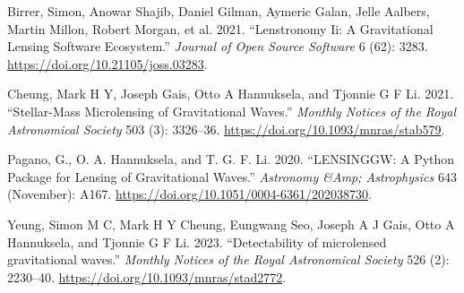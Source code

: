 \documentclass[10pt,a4paper,onecolumn]{article}
\begin{document}
\hypertarget{refs}{}
\begin{cslreferences}
\leavevmode\hypertarget{ref-Birrer_2021}{}%
Birrer, Simon, Anowar Shajib, Daniel Gilman, Aymeric Galan, Jelle
Aalbers, Martin Millon, Robert Morgan, et al. 2021. ``Lenstronomy Ii: A
Gravitational Lensing Software Ecosystem.'' \emph{Journal of Open Source
Software} 6 (62): 3283. \url{https://doi.org/10.21105/joss.03283}.

\leavevmode\hypertarget{ref-Cheung_2021}{}%
Cheung, Mark H Y, Joseph Gais, Otto A Hannuksela, and Tjonnie G F Li.
2021. ``Stellar-Mass Microlensing of Gravitational Waves.''
\emph{Monthly Notices of the Royal Astronomical Society} 503 (3):
3326--36. \url{https://doi.org/10.1093/mnras/stab579}.

\leavevmode\hypertarget{ref-Pagano_2020}{}%
Pagano, G., O. A. Hannuksela, and T. G. F. Li. 2020. ``LENSINGGW: A
Python Package for Lensing of Gravitational Waves.'' \emph{Astronomy
\&Amp; Astrophysics} 643 (November): A167.
\url{https://doi.org/10.1051/0004-6361/202038730}.

\leavevmode\hypertarget{ref-Yeung_2023}{}%
Yeung, Simon M C, Mark H Y Cheung, Eungwang Seo, Joseph A J Gais, Otto A
Hannuksela, and Tjonnie G F Li. 2023. ``Detectability of microlensed
gravitational waves.'' \emph{Monthly Notices of the Royal Astronomical
Society} 526 (2): 2230--40.
\url{https://doi.org/10.1093/mnras/stad2772}.
\end{cslreferences}
\end{document}
